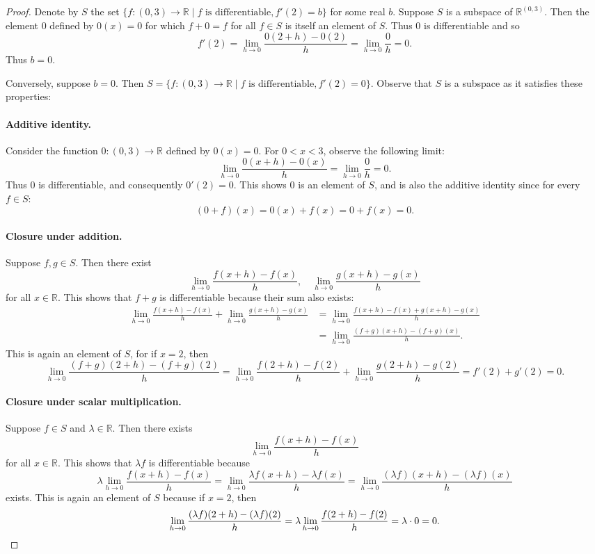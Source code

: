 \documentclass{exam}
\begin{document}
\begin{proof}
    Denote by $S$ the set $\{f: (0, 3)\to\mathbb R\mid f\text{ is differentiable}, f'(2) = b\}$ for some real $b$. Suppose $S$ is a subspace of $\mathbb R^{(0, 3)}$. Then the element $0$ defined by $0(x) = 0$ for which $f + 0 = f$ for all $f\in S$ is itself an element of $S$. Thus $0$ is differentiable and so \[
        f'(2) = \lim_{h\to0}\frac{0(2 + h) - 0(2)}h = \lim_{h\to0}\frac{0}h = 0.
    \]
    Thus $b = 0$.

    Conversely, suppose $b = 0$. Then $S = \{f:(0, 3)\to\mathbb R\mid f\text{ is differentiable}, f'(2) = 0\}$. Observe that $S$ is a subspace as it satisfies these properties:
    \paragraph{Additive identity.} Consider the function $0:(0, 3)\to\mathbb R$ defined by $0(x) = 0$. For $0 < x < 3$, observe the following limit: \[
        \lim_{h\to0}\frac{0(x + h) - 0(x)}h = \lim_{h\to0}\frac0h = 0.
    \]
    Thus $0$ is differentiable, and consequently $0'(2) = 0$. This shows $0$ is an element of $S$, and is also the additive identity since for every $f\in S$: \[
        (0 + f)(x) = 0(x) + f(x) = 0 + f(x) = 0.
    \]

    \paragraph{Closure under addition.} Suppose $f,g\in S$. Then there exist \[
        \lim_{h\to 0}\frac{f(x + h) - f(x)}h, \quad\lim_{h\to0}\frac{g(x + h) - g(x)}h
    \]
    for all $x\in\mathbb R$. This shows that $f + g$ is differentiable because their sum also exists: 
    \begin{align*}
        \lim_{h\to0}\frac{f(x + h) - f(x)}h+\lim_{h\to0}\frac{g(x + h) - g(x)}h &= \lim_{h\to0}\frac{f(x + h) - f(x) + g(x + h) - g(x)}h\\
        &=\lim_{h\to0}\frac{(f + g)(x + h) - (f + g)(x)}h.
    \end{align*}
    This is again an element of $S$, for if $x = 2$, then \[
        \lim_{h\to0}\frac{(f + g)(2 + h) - (f + g)(2)}h = \lim_{h\to0}\frac{f(2 + h) - f(2)}h + \lim_{h\to0}\frac{g(2 + h) - g(2)}h = f'(2) + g'(2) = 0.
    \]

    \paragraph{Closure under scalar multiplication.} Suppose $f\in S$ and $\lambda\in\mathbb R$. Then there exists \[
        \lim_{h\to0}\frac{f(x + h) - f(x)}h
    \]
    for all $x\in\mathbb R$. This shows that $\lambda f$ is differentiable because \[
        \lambda\lim_{h\to0}\frac{f(x + h) - f(x)}h = \lim_{h\to0}\frac{\lambda f(x + h) - \lambda f(x)}h = \lim_{h\to0}\frac{(\lambda f)(x + h) - (\lambda f)(x)}h
    \]
    exists. This is again an element of $S$ because if $x = 2$, then \[
        \lim_{h\to0}\frac{(\lambda f)(2 + h) - (\lambda f)(2)}h = \lambda\lim_{h\to0}\frac{f(2 + h) - f(2)}h = \lambda\cdot0 = 0.\qedhere
    \]
\end{proof}
\end{document}

